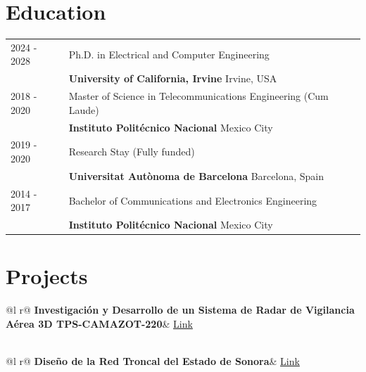 \documentclass[letterpaper,10pt]{article}
\begin{document}
\section{Education}
\begin{tabularx}{\linewidth}{@{}l X@{}}	
2024 - 2028 & Ph.D. in Electrical and Computer Engineering \\ & \textbf{University of California, Irvine} \hfill Irvine, USA \\

2018 - 2020 & Master of Science in Telecommunications Engineering (Cum Laude) \\ & \textbf{Instituto Politécnico Nacional} \hfill Mexico City \\

2019 - 2020 & Research Stay (Fully funded) \\ & \textbf{Universitat Autònoma de Barcelona} \hfill Barcelona, Spain\\

2014 - 2017 & Bachelor of Communications and Electronics Engineering \\ & \textbf{Instituto Politécnico Nacional} \hfill Mexico City \\


\end{tabularx}
\section{Projects}

\begin{tabularx}{\linewidth}{ @{}l r@{} }
\textbf{Investigación y Desarrollo de un Sistema de Radar de Vigilancia Aérea 3D TPS-CAMAZOT-220}& \hfill \href{https://www.infodefensa.com/texto-diario/mostrar/4537048/sistema-radar-vigilancia-aerea-3d-220-km-tps-camazot-220-desarrollo-mexicano}{Link}\\[3.75pt]
  \\
\end{tabularx}

\begin{tabularx}{\linewidth}{ @{}l r@{} }
\textbf{Diseño de la Red Troncal del Estado de Sonora}& \hfill \href{https://oficialiamayor.sonora.gob.mx/servicios-e-informacion/diseno-de-la-red-troncal-del-estado-de-sonora.html}{Link}\\[3.75pt]
  \\
\end{tabularx}
\end{document}
